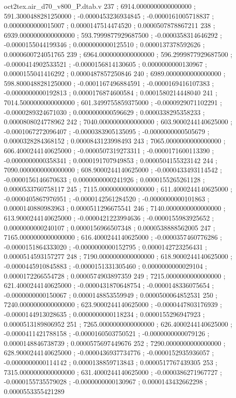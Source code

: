 \begin{filecontents}[overwrite]{oct2tex.air_d70_v800_P.dtab.v}
237 ; 6914.0000000000000000 ; 591.3000488281250000 ; -0.0000453236934845 ; -0.0000161005718837 ; 0.0000000000015007 ; 0.0000147514474520 ; 0.0000507878867211
238 ; 6939.0000000000000000 ; 593.7999877929687500 ; -0.0000358314646292 ; -0.0000155044199346 ; 0.0000000000125510 ; 0.0000137378592626 ; 0.0000600724051765
239 ; 6964.0000000000000000 ; 596.2999877929687500 ; -0.0000414902533521 ; -0.0000156814130605 ; 0.0000000000130967 ; 0.0000155041416292 ; 0.0000487857250846
240 ; 6989.0000000000000000 ; 598.8000488281250000 ; -0.0001167496884591 ; -0.0000169416107383 ; -0.0000000000192813 ; 0.0000176874600584 ; 0.0001580214448040
241 ; 7014.5000000000000000 ; 601.3499755859375000 ; -0.0000929071102291 ; -0.0000289324671030 ; 0.0000000000596629 ; 0.0000338295358233 ; 0.0000808024778962
242 ; 7040.0000000000000000 ; 603.9000244140625000 ; -0.0001067272096407 ; -0.0000383905135095 ; -0.0000000000505679 ; 0.0000328284368152 ; 0.0000843123998493
243 ; 7065.0000000000000000 ; 606.4000244140625000 ; -0.0000507319273311 ; -0.0000171600113390 ; -0.0000000000358341 ; 0.0000191707949853 ; 0.0000504155323142
244 ; 7090.0000000000000000 ; 608.9000244140625000 ; -0.0000433493114542 ; -0.0000156146670633 ; 0.0000000000241926 ; 0.0000155265261128 ; 0.0000533760758117
245 ; 7115.0000000000000000 ; 611.4000244140625000 ; -0.0000405867976951 ; -0.0000142561284520 ; -0.0000000000101863 ; 0.0000140880983963 ; 0.0000511296675541
246 ; 7140.0000000000000000 ; 613.9000244140625000 ; -0.0000421223994636 ; -0.0000155983925652 ; 0.0000000000240107 ; 0.0000156966507348 ; 0.0000538888562005
247 ; 7165.0000000000000000 ; 616.4000244140625000 ; -0.0000357460776286 ; -0.0000151864333020 ; -0.0000000000152795 ; 0.0000142723256431 ; 0.0000514593157277
248 ; 7190.0000000000000000 ; 618.9000244140625000 ; -0.0000445910845883 ; -0.0000151331305460 ; 0.0000000000029104 ; 0.0000172266554728 ; 0.0000574903897359
249 ; 7215.0000000000000000 ; 621.4000244140625000 ; -0.0000431870648754 ; -0.0000148336075654 ; -0.0000000000150067 ; 0.0000148853559949 ; 0.0000500064852531
250 ; 7240.0000000000000000 ; 623.9000244140625000 ; -0.0000447803176939 ; -0.0000144913028635 ; 0.0000000000118234 ; 0.0000155296947923 ; 0.0000513189806952
251 ; 7265.0000000000000000 ; 626.4000244140625000 ; -0.0000411421788158 ; -0.0000160503750521 ; -0.0000000000079126 ; 0.0000148846738739 ; 0.0000575697449676
252 ; 7290.0000000000000000 ; 628.9000244140625000 ; -0.0000436937734776 ; -0.0000152935936057 ; -0.0000000000114142 ; 0.0000138859713843 ; 0.0000517767439305
253 ; 7315.0000000000000000 ; 631.4000244140625000 ; -0.0000386271967727 ; -0.0000155735579028 ; -0.0000000000130967 ; 0.0000143432662298 ; 0.0000553355421289

\end{filecontents}
